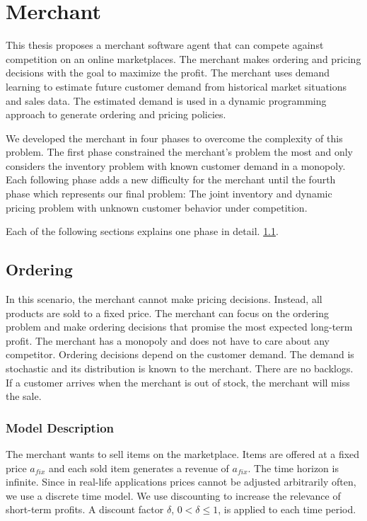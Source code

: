 
\chapter{Merchant}
This thesis proposes a merchant software agent that can compete against competition on an online marketplaces.
The merchant makes ordering and pricing decisions with the goal to maximize the profit.
The merchant uses demand learning to estimate future customer demand from historical market situations and sales data.
The estimated demand is used in a dynamic programming approach to generate ordering and pricing policies.

We developed the merchant in four phases to overcome the complexity of this problem.
The first phase constrained the merchant's problem the most and only considers the inventory problem with known customer demand in a monopoly.
Each following phase adds a new difficulty for the merchant until the fourth phase which represents our final problem: The joint inventory and dynamic pricing problem with unknown customer behavior under competition.

Each of the following sections explains one phase in detail.
 \cref{section:ordering}.

\section{Ordering}
\label{section:ordering}
In this scenario, the merchant cannot make pricing decisions.
Instead, all products are sold to a fixed price.
The merchant can focus on the ordering problem and make ordering decisions that promise the most expected long-term profit.
The merchant has a monopoly and does not have to care about any competitor.
Ordering decisions depend on the customer demand.
The demand is stochastic and its distribution is known to the merchant.
There are no backlogs. %
If a customer arrives when the merchant is out of stock, the merchant will miss the sale.

\subsection{Model Description}
\label{subs:ordering_model}
The merchant wants to sell items on the marketplace.
Items are offered at a fixed price $a_{fix}$ and each sold item generates a revenue of $a_{fix}$.
The time horizon is infinite.
Since in real-life applications prices cannot be adjusted arbitrarily often, we use a discrete time
model.
We use discounting to increase the relevance of short-term profits.
A discount factor $\delta$, $0 < \delta \leq 1$, is applied to each time period.

